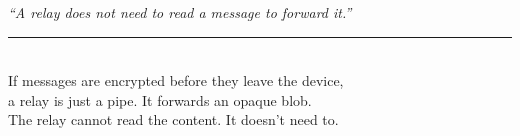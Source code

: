 \documentclass[aspectratio=169, 11pt]{beamer}
\begin{document}
{
\begin{frame}[plain]
\vspace{18mm}
\begin{center}
  {\color{mwlight}\large\itshape ``A relay does not need to read a message to forward it.''}\\[12pt]
  \color{mwrule}\rule{80mm}{0.4pt}\\[10pt]
  {\color{mwgray}\small If messages are encrypted before they leave the device,\\
  a relay is just a pipe. It forwards an opaque blob.\\[6pt]
  The relay cannot read the content. It doesn't need to.}
\end{center}
\end{frame}
}
\end{document}
